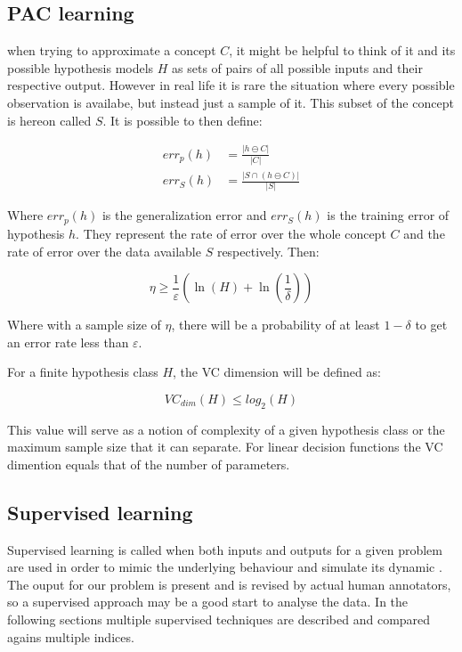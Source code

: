 \subsection{PAC learning}
when trying to approximate a concept $C$, it might be helpful to think of it and
its possible hypothesis models $H$ as sets of pairs of all possible inputs and
their respective output. However in real life it is rare the situation where
every possible observation is availabe, but instead just a sample of it. This
subset of the concept is hereon called $S$. It is possible to then define:

\begin{align}
    err_p(h) &= \frac{\left|h \ominus C\right|}{\left|C\right|}\\
    err_S(h) &= \frac{\left|S\cap (h \ominus C)\right|}{\left|S\right|}
\end{align}

Where $err_p(h)$ is the generalization error and $err_S(h)$ is the training
error of hypothesis $h$. They represent the rate of error over the whole concept
$C$ and the rate of error over the data available $S$ respectively. Then:

\begin{equation}
    \eta \geq \frac{1}{\varepsilon}\left(\ln{(H) +
        \ln{\left(\frac{1}{\delta}\right)}}\right)
\end{equation}

Where with a sample size of $\eta$, there will be a probability of at least
$1-\delta$ to get an error rate less than $\varepsilon$.

For a finite hypothesis class $H$, the VC dimension will be defined as:

\begin{equation}
    VC_{dim}(H) \leq log_2(H)
\end{equation}

This value will serve as a notion of complexity of a given hypothesis class or
the maximum sample size that it can separate. For linear decision functions the
VC dimention equals that of the number of parameters.

\subsection{Supervised learning\label{sec:supervised}} 

Supervised learning is called when both inputs and outputs for a given problem
are used in order to mimic the underlying behaviour and simulate its dynamic
\cite{supervised:definition:rusell}. The ouput for our problem is present and is
revised by actual human annotators, so a supervised approach may be a good start
to analyse the data. In the following sections multiple supervised techniques
are described and compared agains multiple indices.


